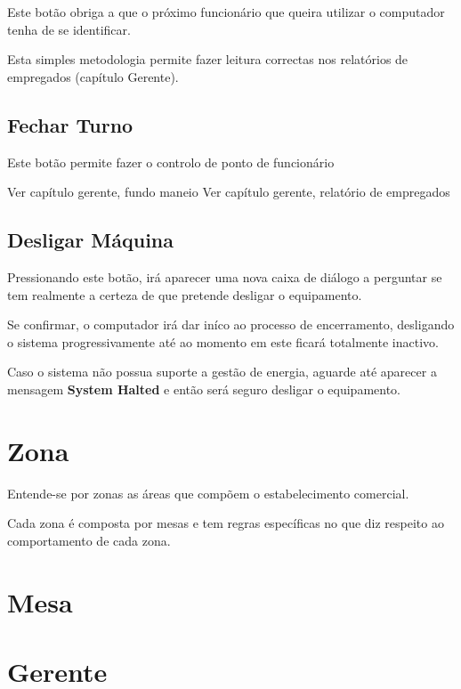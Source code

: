 \documentclass[a4paper,11pt,openany]{memoir}
\begin{document}
Este botão obriga a que o próximo funcionário que queira utilizar o computador tenha de se identificar.

Esta simples metodologia permite fazer leitura correctas nos relatórios de empregados (capítulo Gerente).

\section{Fechar Turno}

Este botão permite fazer o controlo de ponto de funcionário

Ver capítulo gerente, fundo maneio
Ver capítulo gerente, relatório de empregados


\section{Desligar Máquina}

Pressionando este botão, irá aparecer uma nova caixa de diálogo a perguntar se tem realmente a certeza
de que pretende desligar o equipamento.

Se confirmar, o computador irá dar iníco ao processo de encerramento, desligando o sistema progressivamente
até ao momento em este ficará totalmente inactivo.

\begin{boxedminipage}{\textwidth}
        Caso o sistema não possua suporte a gestão de energia,
	aguarde até aparecer a mensagem \textbf{System Halted} e então será seguro desligar o equipamento.
\end{boxedminipage}



\chapter{Zona}

Entende-se por zonas as áreas que compõem o estabelecimento comercial.

Cada zona é composta por mesas e tem regras específicas no que diz respeito ao comportamento de cada zona.




\chapter{Mesa}

\chapter{Gerente}
\end{document}
